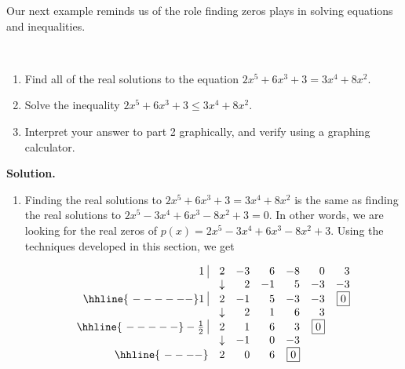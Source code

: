 \medskip

Our next example reminds us of the role finding zeros plays in solving equations and inequalities.

\begin{ex}  $~$

\begin{enumerate}

\item  Find all of the real solutions to the equation $2x^5+6x^3+3 = 3x^4+8x^2$. 

\item  Solve the inequality $2x^5+6x^3+3 \leq 3x^4+8x^2$.

\item  Interpret your answer to part 2 graphically, and verify using a graphing calculator.


\end{enumerate}

{\bf Solution.} 

\begin{enumerate}

\item  Finding the real solutions to $2x^5+6x^3+3 = 3x^4+8x^2$ is the same as finding the real solutions to $2x^5-3x^4+6x^3-8x^2+3=0$.  In other words, we are looking for the real zeros of $p(x)=  2x^5-3x^4+6x^3-8x^2+3$.  Using the techniques developed in this section, we get

\[\begin{array}{rrrrrrr}
1 \, \, \vline& 2 & -3 & 6  & -8 & 0 &3 \\

  & \downarrow     &  2  &  -1  & 5 & -3 & -3\\ \hhline{~------} 

 1 \, \, \vline& 2 & -1 & 5  & -3 & -3 & \fbox{$0$} \\

  & \downarrow     &  2 &  1  & 6 & 3 &\\ \hhline{~-----} 
  
  -\frac{1}{2} \, \, \vline&  2 &  1  & 6 & 3 &  \fbox{$0$} & \\
    
               & \downarrow &  -1  &  0  & -3 &&\\ \hhline{~----} 
 
   & 2  &   0  & 6& \fbox{0} &&   \\
  


\end{array}\]



\end{enumerate}
\end{ex}
